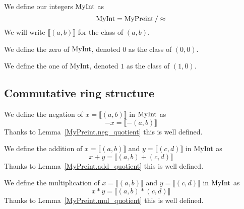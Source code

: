 \begin{definition}
    \label{MyInt}
    \leanok
    We define our integers $\mathrm{MyInt}$ as
\[
\mathrm{MyInt} = \mathrm{MyPreint} \, / \approx
\]
We will write $\llbracket (a, b) \rrbracket$ for the class of $(a,b)$.
\end{definition}

\begin{definition}
    \label{MyInt.zero}
    \leanok
We define the zero of $\mathrm{MyInt}$, denoted $0$ as the class of $(0,0)$.
\end{definition}

\begin{definition}
    \label{MyInt.one}
    \leanok
We define the one of $\mathrm{MyInt}$, denoted $1$ as the class of $(1,0)$.
\end{definition}

\subsection{Commutative ring structure}

\begin{definition}
    \label{MyInt.neg}
    \leanok
We define the negation of $x = \llbracket (a, b) \rrbracket$ in $\mathrm{MyInt}$ as
\[
-x = \llbracket -(a, b) \rrbracket
\]
Thanks to Lemma~\ref{MyPreint.neg_quotient} this is well defined.
\end{definition}

\begin{definition}
    \label{MyInt.add}
    \leanok
We define the addition of $x = \llbracket (a, b) \rrbracket$ and $y = \llbracket (c, d) \rrbracket$ in $\mathrm{MyInt}$ as
\[
x + y = \llbracket (a, b)+(c,d) \rrbracket
\]
Thanks to Lemma~\ref{MyPreint.add_quotient} this is well defined.
\end{definition}

\begin{definition}
    \label{MyInt.mul}
    \leanok
We define the multiplication of $x = \llbracket (a, b) \rrbracket$ and $y = \llbracket (c, d) \rrbracket$ in $\mathrm{MyInt}$ as
\[
x * y = \llbracket (a, b)*(c,d) \rrbracket
\]
Thanks to Lemma~\ref{MyPreint.mul_quotient} this is well defined.
\end{definition}

